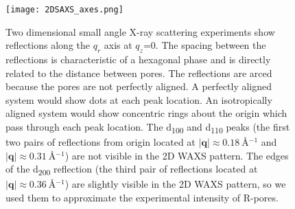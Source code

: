   \begin{figure}[!htb]
  \centering
  \texttt{[image: 2DSAXS\_axes.png]}
  \caption{Two dimensional small angle X-ray scattering experiments show
  reflections along the $q_r$ axis at $q_z$=0. The spacing between the reflections
  is characteristic of a hexagonal phase and is directly related to the distance
  between pores. The reflections are arced because the pores are not perfectly
  aligned. A perfectly aligned system would show dots at each peak location. An
  isotropically aligned system would show concentric rings about the origin which
  pass through each peak location. The d\textsubscript{100} and d\textsubscript{110} 
  peaks (the first two pairs of reflections from origin located at $|\mathbf{q}| 
  \approx 0.18~$\AA$^{-1}$ and $|\mathbf{q}| \approx 0.31~$\AA$^{-1}$) are not visible
  in the 2D WAXS pattern. The edges of the d\textsubscript{200} reflection (the third
  pair of reflections located at $|\mathbf{q}| \approx 0.36~$\AA$^{-1}$) are slightly
  visible in the 2D WAXS pattern, so we used them to approximate the experimental
  intensity of R-pores.}\label{S-fig:2DSAXS}
  \end{figure}

  \newpage

